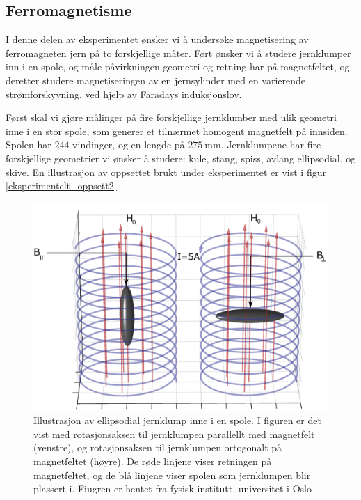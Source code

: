 \documentclass[%
 reprint,
 amsmath,amssymb,
 aps,
 norsk,
]{revtex4-1}
\begin{document}
\subsection{Ferromagnetisme}
I denne delen av eksperimentet ønsker vi å undersøke magnetisering av ferromagneten jern på to forskjellige måter. Ført ønsker vi å studere jernklumper inn i en spole, og måle påvirkningen geometri og retning har på magnetfeltet, og deretter studere magnetiseringen av en jernsylinder med en varierende strømforskyvning, ved hjelp av Faradays induksjonslov. \par
Først skal vi gjøre målinger på fire forskjellige jernklumber med ulik geometri inne i en stor spole, som generer et tilnærmet homogent magnetfelt på innsiden. Spolen har $244$ vindinger, og en lengde på $\SI{275}{\milli\meter}$. Jernklumpene har fire forskjellige geometrier vi ønsker å studere: kule, stang, spiss, avlang ellipsodial. og skive. En illustrasjon av oppsettet brukt under eksperimentet er vist i figur \vref{eksperimentelt_oppsett2}.
\begin{figure}[h!]
  \centering
  \includegraphics[scale=0.24]{oppsett2.png}
  \caption{Illustrasjon av ellipsodial jernklump inne i en spole. I figuren er det vist med rotasjonsaksen til jernklumpen parallellt med magnetfelt (venstre), og rotasjonsaksen til jernklumpen ortogonalt på magnetfeltet (høyre). De røde linjene viser retningen på magnetfeltet, og de blå linjene viser spolen som jernklumpen blir plassert i. Fiugren er hentet fra fysisk institutt, universitet i Oslo \cite{oppgave}.}
  \label{eksperimentelt_oppsett2}
\end{figure}
\end{document}
